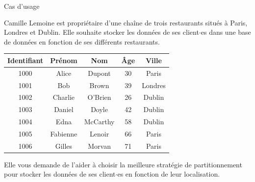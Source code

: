 \begin{frame}{Cas d'usage}

    Camille Lemoine est propriétaire d'une chaîne de trois restaurants situés à Paris, Londres et Dublin. Elle souhaite stocker les données de ses client$\cdot$es dans une base de données en fonction de ses différents restaurants.

    \begin{table}[]
        \begin{tabular}{|c|c|c|c|c|}
        \hline
        \rowcolor{lipstick}\color{white}\textbf{Identifiant} & \color{white}\textbf{Prénom} & \color{white}\textbf{Nom}  & \color{white}\textbf{Âge} & \color{white}\textbf{Ville}  \\\hline
        1000                 & Alice           & Dupont        & 30           & Paris \\
        1001                 & Bob             & Brown         & 39           & Londres \\
        1002                 & Charlie         & O'Brien       & 26           & Dublin \\
        1003                 & Daniel          & Doyle         & 42           & Dublin \\
        1004                 & Edna            & McCarthy      & 58           & Dublin \\
        1005                 & Fabienne        & Lenoir        & 66           & Paris \\
        1006                 & Gilles          & Morvan        & 71           & Paris \\
        \hline
        \end{tabular}
    \end{table}

    Elle vous demande de l'aider à choisir la meilleure stratégie de partitionnement pour stocker les données de ses client$\cdot$es en fonction de leur localisation.

\end{frame}


